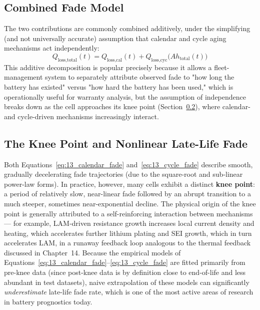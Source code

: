 \subsection{Combined Fade Model}
\label{subsec:13_combined_fade}

The two contributions are commonly combined additively, under the simplifying (and not universally accurate) assumption that calendar and cycle aging mechanisms act independently:
\begin{equation}
    Q_{\text{loss,total}}(t) = Q_{\text{loss,cal}}(t) + Q_{\text{loss,cyc}}\big(Ah_{\text{total}}(t)\big)
    \label{eq:13_combined_fade}
\end{equation}
This additive decomposition is popular precisely because it allows a fleet-management system to separately attribute observed fade to "how long the battery has existed" versus "how hard the battery has been used," which is operationally useful for warranty analysis, but the assumption of independence breaks down as the cell approaches its knee point (Section~\ref{subsec:13_knee_point}), where calendar- and cycle-driven mechanisms increasingly interact.

\subsection{The Knee Point and Nonlinear Late-Life Fade}
\label{subsec:13_knee_point}

Both Equations~\ref{eq:13_calendar_fade} and~\ref{eq:13_cycle_fade} describe smooth, gradually decelerating fade trajectories (due to the square-root and sub-linear power-law forms). In practice, however, many cells exhibit a distinct \textbf{knee point}: a period of relatively slow, near-linear fade followed by an abrupt transition to a much steeper, sometimes near-exponential decline. The physical origin of the knee point is generally attributed to a self-reinforcing interaction between mechanisms — for example, LAM-driven resistance growth increases local current density and heating, which accelerates further lithium plating and SEI growth, which in turn accelerates LAM, in a runaway feedback loop analogous to the thermal feedback discussed in Chapter~14. Because the empirical models of Equations~\ref{eq:13_calendar_fade}–\ref{eq:13_cycle_fade} are fitted primarily from pre-knee data (since post-knee data is by definition close to end-of-life and less abundant in test datasets), naive extrapolation of these models can significantly \emph{underestimate} late-life fade rate, which is one of the most active areas of research in battery prognostics today.

